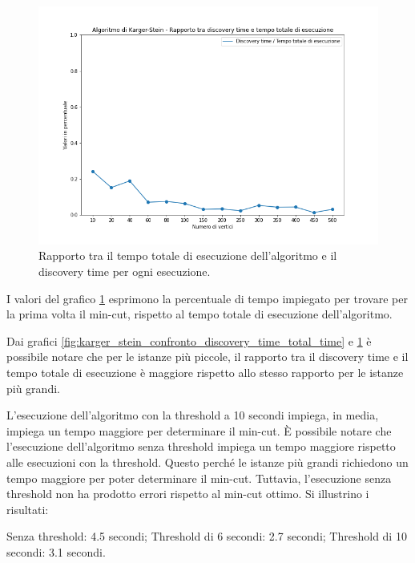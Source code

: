 \begin{figure}[H]
	\centering
	\includegraphics[width=1\textwidth]{res/images/single/karger-stein/discovery-time/karger_stein_rapporto_discovery_time_total_time.png}
	\caption{Rapporto tra il tempo totale di esecuzione dell'algoritmo 
	e il discovery time per ogni esecuzione.}
	\label{fig:karger_stein_rapporto_discovery_time_total_time}
\end{figure}

I valori del grafico \ref{fig:karger_stein_rapporto_discovery_time_total_time} 
esprimono la percentuale di tempo impiegato per trovare per la prima 
volta il min-cut, rispetto al tempo totale di esecuzione dell'algoritmo.

Dai grafici \ref{fig:karger_stein_confronto_discovery_time_total_time} 
e \ref{fig:karger_stein_rapporto_discovery_time_total_time} è possibile 
notare che per le istanze più piccole, il rapporto tra il discovery 
time e il tempo totale di esecuzione è maggiore rispetto allo stesso 
rapporto per le istanze più grandi.

L'esecuzione dell'algoritmo con la threshold a 10 secondi impiega, in media, 
impiega un tempo maggiore per determinare il min-cut. È possibile notare che 
l'esecuzione dell'algoritmo senza threshold impiega un tempo maggiore rispetto 
alle esecuzioni con la threshold. Questo perché le istanze più grandi richiedono 
un tempo maggiore per poter determinare il min-cut. Tuttavia, l'esecuzione senza 
threshold non ha prodotto errori rispetto al min-cut ottimo. Si illustrino i 
risultati:

Senza threshold: 4.5 secondi;
Threshold di 6 secondi: 2.7 secondi;
Threshold di 10 secondi: 3.1 secondi.

